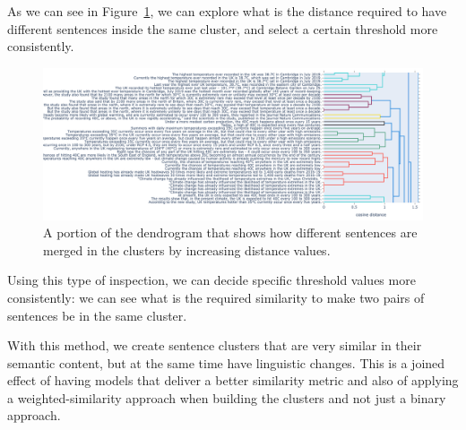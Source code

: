 
As we can see in Figure~\ref{fig:dendrogram}, we can explore what is the distance required to have different sentences inside the same cluster, and select a certain threshold more consistently.
\begin{figure}[!htb]
    \centering
    \includegraphics[width=\linewidth]{figures/dendrogram.png}
    \caption{A portion of the dendrogram that shows how different sentences are merged in the clusters by increasing distance values.}
    \label{fig:dendrogram}
\end{figure}

Using this type of inspection, we can decide specific threshold values more consistently: we can see what is the required similarity to make two pairs of sentences be in the same cluster.

With this method, we create sentence clusters that are very similar in their semantic content, but at the same time have linguistic changes. This is a joined effect of having models that deliver a better similarity metric and also of applying a weighted-similarity approach when building the clusters and not just a binary approach.

